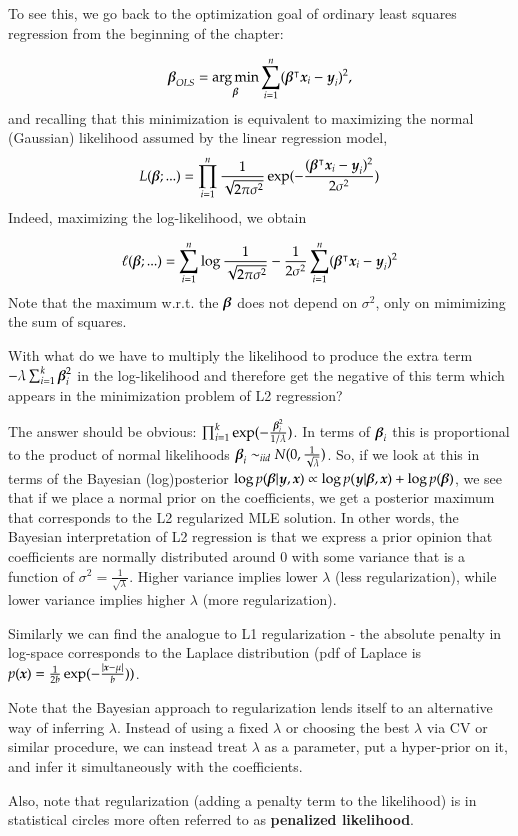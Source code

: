 \begin{refsection}
To see this, we go back to the optimization goal of ordinary least squares regression from the beginning of the chapter:

$$\boldsymbol{\beta}_{OLS} = \operatorname*{arg\,min}_{\boldsymbol{\beta}} \sum_{i=1}^n (\boldsymbol{\beta}^\intercal\boldsymbol{x}_i - \boldsymbol{y}_i)^2,$$
%
and recalling that this minimization is equivalent to maximizing the normal (Gaussian) likelihood assumed by the linear regression model,
%
$$L(\boldsymbol{\beta};...) = \prod_{i=1}^n \frac{1}{\sqrt{2\pi\sigma^2}}\exp(-\frac{(\boldsymbol{\beta}^\intercal\boldsymbol{x}_i - \boldsymbol{y}_i)^2}{2\sigma^2})$$
Indeed, maximizing the log-likelihood, we obtain
 
$$\ell(\boldsymbol{\beta};...) = \sum_{i=1}^n \log\frac{1}{\sqrt{2\pi\sigma^2}} - \frac{1}{2\sigma^2}\sum_{i=1}^n(\boldsymbol{\beta}^\intercal\boldsymbol{x}_i - \boldsymbol{y}_i)^2$$
%
Note that the maximum w.r.t. the $\boldsymbol{\beta}$ does not depend on $\sigma^2$, only on mimimizing the sum of squares.

With what do we have to multiply the likelihood to produce the extra term $-\lambda \sum_{i=1}^k \boldsymbol{\beta}_i^2$ in the log-likelihood and therefore get the negative of this term which appears in the minimization problem of L2 regression? 

The answer should be obvious: $\prod_{i=1}^k\exp(-\frac{\boldsymbol{\beta}_i^2}{1 / \lambda})$. In terms of $\boldsymbol{\beta}_i$ this is proportional to the product of normal likelihoods $\boldsymbol{\beta}_i \sim_{iid} N(0, \frac{1}{\sqrt{\lambda}})$. So, if we look at this in terms of the Bayesian (log)posterior $\log p(\boldsymbol{\beta} | \boldsymbol{y}, \boldsymbol{x}) \propto \log p(\boldsymbol{y} | \boldsymbol{\beta}, \boldsymbol{x}) + \log p(\boldsymbol{\beta})$, we see that if we place a normal prior on the coefficients, we get a posterior maximum that corresponds to the L2 regularized MLE solution. In other words, the Bayesian interpretation of L2 regression is that we express a prior opinion that coefficients are normally distributed around 0 with some variance that is a function of $\sigma^2 = \frac{1}{\sqrt{\lambda}}$. Higher variance implies lower $\lambda$ (less regularization), while lower variance implies higher $\lambda$ (more regularization).

Similarly we can find the analogue to L1 regularization - the absolute penalty in log-space corresponds to the Laplace distribution (pdf of Laplace is $p(\boldsymbol{x}) = \frac{1}{2b}\exp(-\frac{|\boldsymbol{x} - \mu|}{b}))$.

Note that the Bayesian approach to regularization lends itself to an alternative way of inferring $\lambda$. Instead of using a fixed $\lambda$ or choosing the best $\lambda$ via CV or similar procedure, we can instead treat $\lambda$ as a parameter, put a hyper-prior on it, and infer it simultaneously with the coefficients.

Also, note that regularization (adding a penalty term to the likelihood) is in statistical circles more often referred to as \textbf{penalized likelihood}.


\end{refsection}
